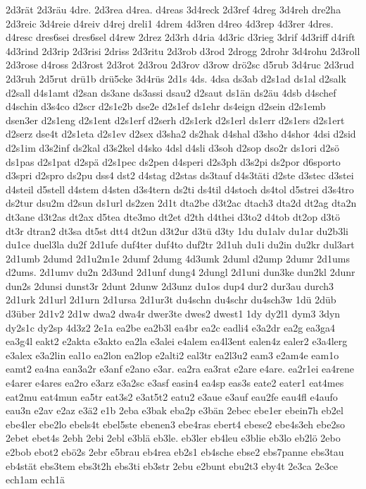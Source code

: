 {2d3rät
2d3räu
4dre.
2d3rea
d4rea.
d4reas
3d4reck
2d3ref
4dreg
3d4reh
dre2ha
2d3reic
3d4reie
d4reiv
d4rej
dreli1
4drem
4d3ren
d4reo
4d3rep
4d3rer
4dres.
d4resc
dres6sei
dres6sel
d4rew
2drez
2d3rh
d4ria
4d3ric
d3rieg
3drif
4d3riff
d4rift
4d3rind
2d3rip
2d3risi
2driss
2d3ritu
2d3rob
d3rod
2drogg
2drohr
3d4rohu
2d3roll
2d3rose
d4ross
2d3rost
2d3rot
2d3rou
2d3rov
d3row
drö2sc
d5rub
3d4ruc
2d3rud
2d3ruh
2d5rut
drü1b
drü5cke
3d4rüs
2d1s
4ds.
4dsa
ds3ab
d2s1ad
ds1al
d2salk
d2sall
d4s1amt
d2san
ds3ane
ds3assi
dsau2
d2saut
ds1än
ds2äu
4dsb
d4schef
d4schin
d3s4co
d2scr
d2s1e2b
dse2e
d2s1ef
ds1ehr
ds4eign
d2sein
d2s1emb
dsen3er
d2s1eng
d2s1ent
d2s1erf
d2serh
d2s1erk
d2s1erl
ds1err
d2s1ers
d2s1ert
d2serz
dse4t
d2s1eta
d2s1ev
d2sex
d3sha2
ds2hak
d4shal
d3sho
d4shor
4dsi
d2sid
d2s1im
d3s2inf
ds2kal
d3s2kel
d4sko
4dsl
d4sli
d3soh
d2sop
dso2r
ds1ori
d2sö
ds1pas
d2s1pat
d2spä
d2s1pec
ds2pen
d4speri
d2s3ph
d3s2pi
ds2por
d6sporto
d3spri
d2spro
ds2pu
dss4
dst2
d4stag
d2stas
ds3tauf
d4s3täti
d2ste
d3stec
d3stei
d4steil
d5stell
d4stem
d4sten
d3s4tern
ds2ti
ds4til
d4stoch
ds4tol
d5strei
d3s4tro
ds2tur
dsu2m
d2sun
ds1url
ds2zen
2d1t
dta2be
d3t2ac
dtach3
dta2d
dt2ag
dta2n
dt3ane
d3t2as
dt2ax
d5tea
dte3mo
dt2et
d2th
d4thei
d3to2
d4tob
dt2op
d3tö
dt3r
dtran2
dt3sa
dt5st
dtt4
dt2un
d3t2ur
d3tü
d3ty
1du
du1alv
du1ar
du2b3li
du1ce
duel3la
du2f
2d1ufe
duf4ter
duf4to
duf2tr
2d1uh
du1i
du2in
du2kr
dul3art
2d1umb
2dumd
2d1u2m1e
2dumf
2dumg
4d3umk
2duml
d2ump
2dumr
2d1ums
d2ums.
2d1umv
du2n
2d3und
2d1unf
dung4
2dungl
2d1uni
dun3ke
dun2kl
2dunr
dun2s
2dunsi
dunst3r
2dunt
2dunw
2d3unz
du1os
dup4
dur2
dur3au
durch3
2d1urk
2d1url
2d1urn
2d1ursa
2d1ur3t
du4schn
du4schr
du4sch3w
1dü
2düb
d3über
2d1v2
2d1w
dwa2
dwa4r
dwer3te
dwes2
dwest1
1dy
dy2l1
dym3
3dyn
dy2s1c
dy2sp
4d3z2
2e1a
ea2be
ea2b3l
ea4br
ea2c
eadli4
e3a2dr
ea2g
ea3ga4
ea3g4l
eakt2
e2akta
e3akto
ea2la
e3alei
e4alem
ea4l3ent
ealen4z
ealer2
e3a4lerg
e3alex
e3a2lin
eal1o
ea2lon
ea2lop
e2alti2
eal3tr
ea2l3u2
eam3
e2am4e
eam1o
eamt2
ea4na
ean3a2r
e3anf
e2ano
e3ar.
ea2ra
ea3rat
e2are
e4are.
ea2r1ei
ea4rene
e4arer
e4ares
ea2ro
e3arz
e3a2sc
e3asf
easin4
ea4sp
eas3s
eate2
eater1
eat4mes
eat2mu
eat4mun
ea5tr
eat3s2
e3at5t2
eatu2
e3aue
e3auf
eau2fe
eau4fl
e4aufo
eau3n
e2av
e2az
e3ä2
e1b
2eba
e3bak
eba2p
e3bän
2ebec
ebe1er
ebein7h
eb2el
ebe4ler
ebe2lo
ebels4t
ebel5ste
ebenen3
ebe4ras
ebert4
ebese2
ebe4s3eh
ebe2so
2ebet
ebet4s
2ebh
2ebi
2ebl
e3blä
eb3le.
eb3ler
eb4leu
e3blie
eb3lo
eb2lö
2ebo
e2bob
ebot2
ebö2s
2ebr
e5brau
eb4rea
eb2s1
eb4sche
ebse2
ebs7panne
ebs3tau
eb4stät
ebs3tem
ebs3t2h
ebs3ti
eb3str
2ebu
e2bunt
ebu2t3
eby4t
2e3ca
2e3ce
ech1am
ech1ä
}
